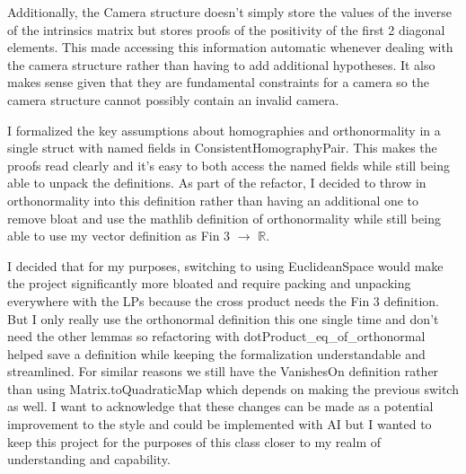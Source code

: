 \documentclass[10pt]{article}
\theoremstyle{plain}
\theoremstyle{definition}
\theoremstyle{remark}
\newcommand{\lean}[1]{{\ttfamily\let\us\_\def\_{\us\allowbreak}#1}}
\begin{document}
Additionally, the \lean{Camera} structure doesn't simply store the values of the inverse of the intrinsics matrix but stores proofs of the positivity of the first 2 diagonal elements. This made accessing this information automatic whenever dealing with the camera structure rather than having to add additional hypotheses. It also makes sense given that they are fundamental constraints for a camera so the camera structure cannot possibly contain an invalid camera.

I formalized the key assumptions about homographies and orthonormality in a single struct with named fields in \lean{ConsistentHomographyPair}. This makes the proofs read clearly and it's easy to both access the named fields while still being able to unpack the definitions. As part of the refactor, I decided to throw in orthonormality into this definition rather than having an additional one to remove bloat and use the mathlib definition of orthonormality while still being able to use my vector definition as \lean{Fin 3 $\to$ $\mathbb{R}$}. 

I decided that for my purposes, switching to using \lean{EuclideanSpace} would make the project significantly more bloated and require packing and unpacking everywhere with the LPs because the cross product needs the \lean{Fin 3} definition. But I only really use the orthonormal definition this one single time and don't need the other lemmas so refactoring with \lean{dotProduct\_eq\_of\_orthonormal} helped save a definition while keeping the formalization understandable and streamlined. For similar reasons we still have the \lean{VanishesOn} definition rather than using \lean{Matrix.toQuadraticMap} which depends on making the previous switch as well. I want to acknowledge that these changes can be made as a potential improvement to the style and could be implemented with AI but I wanted to keep this project for the purposes of this class closer to my realm of understanding and capability.
\end{document}

